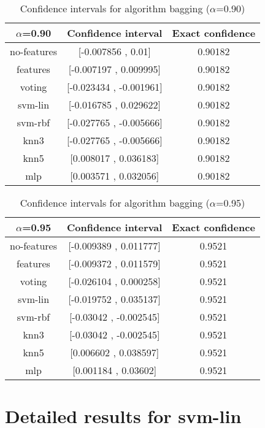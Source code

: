 \documentclass[a4paper,10pt]{article}
\begin{document}
\begin{table}[!htp]
\centering\small
\begin{tabular}{
|c|c|c|}
\hline
 $\alpha$=0.90 & Confidence interval & Exact confidence \\ \hline 
no-features & [-0.007856 , 0.01] & 0.90182\\ \hline 
features & [-0.007197 , 0.009995] & 0.90182\\ \hline 
voting & [-0.023434 , -0.001961] & 0.90182\\ \hline 
svm-lin & [-0.016785 , 0.029622] & 0.90182\\ \hline 
svm-rbf & [-0.027765 , -0.005666] & 0.90182\\ \hline 
knn3 & [-0.027765 , -0.005666] & 0.90182\\ \hline 
knn5 & [0.008017 , 0.036183] & 0.90182\\ \hline 
mlp & [0.003571 , 0.032056] & 0.90182\\ \hline 

\end{tabular}
\caption{Confidence intervals for algorithm bagging ($\alpha$=0.90)}
\end{table}
\begin{table}[!htp]
\centering\small
\begin{tabular}{
|c|c|c|}
\hline
 $\alpha$=0.95 & Confidence interval & Exact confidence \\ \hline 
no-features & [-0.009389 , 0.011777] & 0.9521\\ \hline 
features & [-0.009372 , 0.011579] & 0.9521\\ \hline 
voting & [-0.026104 , 0.000258] & 0.9521\\ \hline 
svm-lin & [-0.019752 , 0.035137] & 0.9521\\ \hline 
svm-rbf & [-0.03042 , -0.002545] & 0.9521\\ \hline 
knn3 & [-0.03042 , -0.002545] & 0.9521\\ \hline 
knn5 & [0.006602 , 0.038597] & 0.9521\\ \hline 
mlp & [0.001184 , 0.03602] & 0.9521\\ \hline 

\end{tabular}
\caption{Confidence intervals for algorithm bagging ($\alpha$=0.95)}
\end{table}

 \clearpage 


\section{Detailed results for svm-lin}
\end{document}
